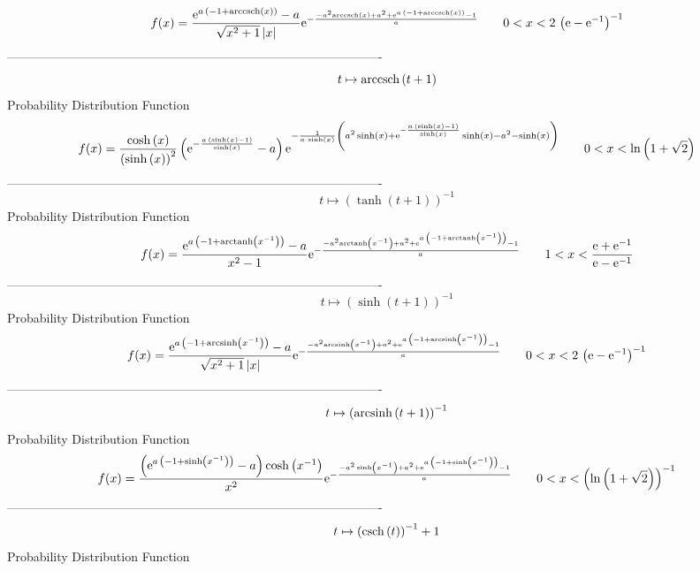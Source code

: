 \documentclass[12pt]{article}
\begin{document}
$$  f(x)={\frac {{{\rm e}^{a\, \left( -1+{\rm arccsch} \left(x\right) \right) }
}-a}{\sqrt {{x}^{2}+1} \left| x \right| }{{\rm e}^{-{\frac {-{a}^{2}
{\rm arccsch} \left(x\right)+{a}^{2}+{{\rm e}^{a\, \left( -1+
{\rm arccsch} \left(x\right) \right) }}-1}{a}}}}}
 \qquad0
 < x < 2\, \left( {\rm e}-{{\rm e}^{-1}} \right) ^{-1}
$$-------------------------------------------------------------------------------------------  \\$$t\mapsto {\rm arccsch} \left(t+1\right)
$$Probability Distribution Function 
$$  f(x)={\frac {\cosh \left( x \right) }{ \left( \sinh \left( x \right) 
 \right) ^{2}} \left( {{\rm e}^{-{\frac {a\, \left( \sinh \left( x
 \right) -1 \right) }{\sinh \left( x \right) }}}}-a \right) {{\rm e}^{
-{\frac {1}{a\,\sinh \left( x \right) } \left( {a}^{2}\sinh \left( x
 \right) +{{\rm e}^{-{\frac {a\, \left( \sinh \left( x \right) -1
 \right) }{\sinh \left( x \right) }}}}\sinh \left( x \right) -{a}^{2}-
\sinh \left( x \right)  \right) }}}}
 \qquad0
 < x < \ln  \left( 1+\sqrt {2} \right) 
$$-------------------------------------------------------------------------------------------  \\$$t\mapsto  \left( \tanh \left( t+1 \right)  \right) ^{-1}
$$Probability Distribution Function 
$$  f(x)={\frac {{{\rm e}^{a\, \left( -1+{\rm arctanh} \left({x}^{-1}\right)
 \right) }}-a}{{x}^{2}-1}{{\rm e}^{-{\frac {-{a}^{2}{\rm arctanh} 
\left({x}^{-1}\right)+{a}^{2}+{{\rm e}^{a\, \left( -1+{\rm arctanh} 
\left({x}^{-1}\right) \right) }}-1}{a}}}}}
 \qquad1
 < x < {\frac {{\rm e}+{{\rm e}^{-1}}}{{\rm e}-{{\rm e}^{-1}}}}
$$-------------------------------------------------------------------------------------------  \\$$t\mapsto  \left( \sinh \left( t+1 \right)  \right) ^{-1}
$$Probability Distribution Function 
$$  f(x)={\frac {{{\rm e}^{a\, \left( -1+{\rm arcsinh} \left({x}^{-1}\right)
 \right) }}-a}{\sqrt {{x}^{2}+1} \left| x \right| }{{\rm e}^{-{\frac {
-{a}^{2}{\rm arcsinh} \left({x}^{-1}\right)+{a}^{2}+{{\rm e}^{a\,
 \left( -1+{\rm arcsinh} \left({x}^{-1}\right) \right) }}-1}{a}}}}}
 \qquad0
 < x < 2\, \left( {\rm e}-{{\rm e}^{-1}} \right) ^{-1}
$$-------------------------------------------------------------------------------------------  \\$$t\mapsto  \left( {\rm arcsinh} \left(t+1\right) \right) ^{-1}
$$Probability Distribution Function 
$$  f(x)={\frac { \left( {{\rm e}^{a\, \left( -1+\sinh \left( {x}^{-1} \right) 
 \right) }}-a \right) \cosh \left( {x}^{-1} \right) }{{x}^{2}}{{\rm e}
^{-{\frac {-{a}^{2}\sinh \left( {x}^{-1} \right) +{a}^{2}+{{\rm e}^{a
\, \left( -1+\sinh \left( {x}^{-1} \right)  \right) }}-1}{a}}}}}
 \qquad0
 < x <  \left( \ln  \left( 1+\sqrt {2} \right)  \right) ^{-1}
$$-------------------------------------------------------------------------------------------  \\$$t\mapsto  \left( {\rm csch} \left(t\right) \right) ^{-1}+1
$$Probability Distribution Function 
\end{document}
